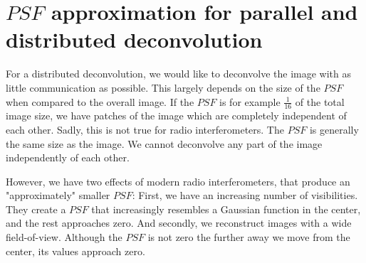 \section{$PSF$ approximation for parallel and distributed deconvolution} \label{gradients}
For a distributed deconvolution, we would like to deconvolve the image with as little communication as possible. This largely depends on the size of the $PSF$ when compared to the overall image. If the $PSF$ is for example $\frac{1}{16}$ of the total image size, we have patches of the image which are completely independent of each other. Sadly, this is not true for radio interferometers. The $PSF$ is generally the same size as the image. We cannot deconvolve any part of the image independently of each other.

However, we have two effects of modern radio interferometers, that produce an "approximately" smaller $PSF$: First, we have an increasing number of visibilities. They create a $PSF$ that increasingly resembles a Gaussian function in the center, and the rest approaches zero. And secondly, we reconstruct images with a wide field-of-view. Although the $PSF$ is not zero the further away we move from the center, its values approach zero.

